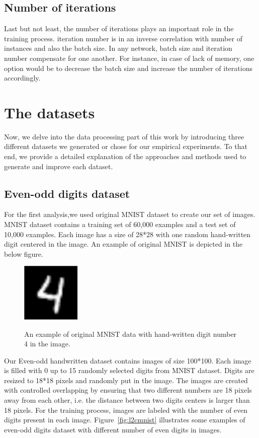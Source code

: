 \subsection{Number of iterations}

Last but not least, the number of iterations plays an important role in the training process. iteration number is in an inverse correlation with number of instances and also the batch size. In any network, batch size and iteration number compensate for one another. For instance, in case of lack of memory, one option would be to decrease the batch size and increase the number of iterations accordingly.

\section{The datasets}

Now, we delve into the data processing part of this work by introducing three different datasets we generated or chose for our empirical experiments. To that end, we provide a detailed explanation of the approaches and methods used to generate and improve each dataset.

\subsection{Even-odd digits dataset}
\label{subsubsec:digit}
For the first analysis,we used original MNIST dataset \cite{lecun1998mnist} to create our set of images. MNIST dataset contains a training set of 60,000 examples and a test set of 10,000 examples. Each image has a size of 28*28 with one random hand-written digit centered in the image. 
An example of original MNIST is depicted in the below figure.

\begin{figure}[H]
	\centering
	{\includegraphics[width=0.25\textwidth]{images/mnist}}
		\caption{An example of original MNIST data with hand-written digit number 4 in the image. }
	\label{fig:mnist}
\end{figure}

Our Even-odd handwritten dataset contains images of size 100*100. Each image is filled with 0 up to 15 randomly selected digits from MNIST dataset. Digits are resized to 18*18 pixels and randomly put in the image. The images are created with controlled overlapping by ensuring that two different numbers are 18 pixels away from each other, i.e. the distance between two digits centers is larger than 18 pixels. For the training process, images are labeled with the number of even digits present in each image. Figure~\ref{fig:l2cmnist} illustrates some examples of even-odd digits dataset with different number of even digits in images. 

